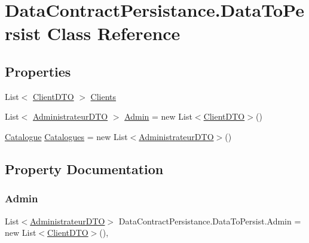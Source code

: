 \hypertarget{classDataContractPersistance_1_1DataToPersist}{}\section{Data\+Contract\+Persistance.\+Data\+To\+Persist Class Reference}
\label{classDataContractPersistance_1_1DataToPersist}
\subsection*{Properties}
\begin{DoxyCompactItemize}
\item 
List$<$ \hyperlink{classDataContractPersistance_1_1ClientDTO}{Client\+D\+TO} $>$ \hyperlink{classDataContractPersistance_1_1DataToPersist_a325374374f5828185f08e8cda75155ac}{Clients}
\item 
List$<$ \hyperlink{classDataContractPersistance_1_1AdministrateurDTO}{Administrateur\+D\+TO} $>$ \hyperlink{classDataContractPersistance_1_1DataToPersist_a9ab63a74b15571d63d9a7b058ab1d199}{Admin} = new List$<$\hyperlink{classDataContractPersistance_1_1ClientDTO}{Client\+D\+TO}$>$()
\item 
\hyperlink{classModele_1_1Catalogue}{Catalogue} \hyperlink{classDataContractPersistance_1_1DataToPersist_a354d03aae2166a6a3e0f05f36cd8f1d8}{Catalogues} = new List$<$\hyperlink{classDataContractPersistance_1_1AdministrateurDTO}{Administrateur\+D\+TO}$>$()
\end{DoxyCompactItemize}


\subsection{Property Documentation}
\mbox{\label{classDataContractPersistance_1_1DataToPersist_a9ab63a74b15571d63d9a7b058ab1d199}} 
\subsubsection{\texorpdfstring{Admin}{Admin}}
{\footnotesize\ttfamily List$<$\hyperlink{classDataContractPersistance_1_1AdministrateurDTO}{Administrateur\+D\+TO}$>$ Data\+Contract\+Persistance.\+Data\+To\+Persist.\+Admin = new List$<$\hyperlink{classDataContractPersistance_1_1ClientDTO}{Client\+D\+TO}$>$()\hspace{0.3cm}{\ttfamily [get]}, {\ttfamily [set]}}

